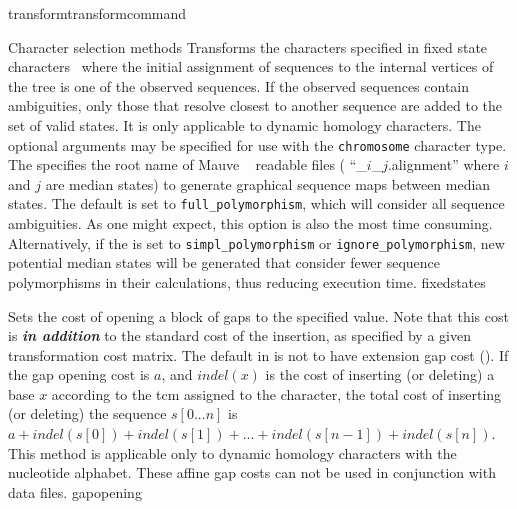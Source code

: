 \begin{command}{transform}{transformcommand}
\begin{arguments}
\begin{argumentgroup}{Character selection methods}
{Transforms the characters specified in fixed state characters~\cite{wheeler1999a}
where the initial assignment of sequences to the internal vertices of
the tree is one of the observed sequences. If the observed sequences
contain ambiguities, only those that resolve closest to another
sequence are added to the set of valid states. It is only
applicable to dynamic homology characters. The optional arguments 
may be specified for use with the \texttt{chromosome} character type. 
The \poystring specifies the root name of Mauve ~\cite{darlingetal2004} 
readable files ( ``\poystring\_$i$\_$j$.alignment'' where $i$ and $j$ are 
median states) to generate graphical sequence maps between median states. 
The default \poylident is set to \texttt{full\_polymorphism}, which will 
consider all sequence ambiguities. As one might expect, this option is also the most 
time consuming. Alternatively, if the \poylident is set to \texttt{simpl\_polymorphism} 
or \texttt{ignore\_polymorphism}, new potential median states will be generated that consider fewer 
sequence polymorphisms in their calculations, thus reducing execution time.}
{fixedstates}

{Sets the cost of opening a block of gaps to the specified value. Note that
this cost is {\bf \emph{in addition}} to the standard cost of the insertion, as
specified by a given transformation cost matrix.
The default in \poy is not to have extension
gap cost (). If the gap
opening cost is
$a$, and $indel(x)$ is the cost of inserting (or deleting) a
base $x$ according to the tcm assigned to the character, the total
cost of inserting (or deleting) the sequence $s[0...n]$ is $a +
indel(s[0]) + indel(s[1]) + ... + indel(s[n - 1]) + indel(s[n]).$
This method is applicable only to dynamic homology characters with
the nucleotide alphabet. These affine gap costs can not be used
in conjunction with  data files.} 
{gapopening}


\end{argumentgroup}
\end{arguments}
\end{command}
